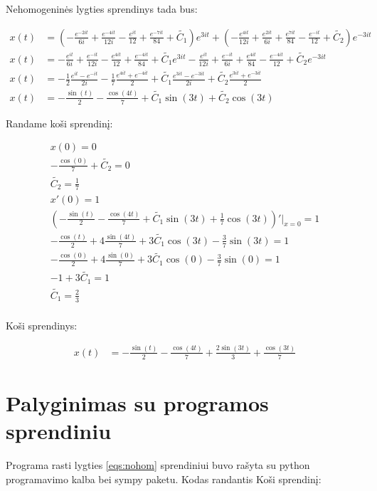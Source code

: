 \documentclass[11pt]{article}
\begin{document}
Nehomogeninės lygties sprendinys tada bus:

\begin{align*}
x(t)&=\left(-\frac{e^{-2it}}{6i}+\frac{e^{-4it}}{12i}-\frac{e^{it}}{12}+\frac{e^{-7it}}{84}+\tilde{C_1}\right)e^{3it}
+\left(-\frac{e^{4it}}{12i}+\frac{e^{2it}}{6i}+\frac{e^{7it}}{84}-\frac{e^{-it}}{12}+\tilde{C_2}\right)e^{-3it}\\
x(t)&=-\frac{e^{it}}{6i}+ \frac{e^{-it}}{12i}-\frac{e^{4it}}{12}+\frac{e^{-4it}}{84}+\tilde{C_1}e^{3it}
-\frac{e^{it}}{12i}+\frac{e^{-it}}{6i}+\frac{e^{4it}}{84}-\frac{e^{-4it}}{12}+\tilde{C_2}e^{-3it}\\
x(t)&=-\frac{1}{2}\frac{e^{it}-e^{-it}}{2i}-\frac{1}{7}\frac{e^{4it}+e^{-4it}}{2}+\tilde{C_1}\frac{e^{3it}-e^{-3it}}{2i}+\tilde{C_2}\frac{e^{3it}+e^{-3it}}{2}\\
x(t)&=-\frac{\sin(t)}{2}-\frac{\cos(4t)}{7}+\tilde{C_1}\sin(3t)+\tilde{C_2}\cos(3t)
\end{align*}

Randame koši sprendinį:

\begin{align*}
x(0)=0\\
-\frac{\cos(0)}{7}+\tilde{C_2}=0\\
\tilde{C_2}=\frac{1}{7}\\
x'(0)=1\\
\left(-\frac{\sin(t)}{2}-\frac{\cos(4t)}{7}+\tilde{C_1}\sin(3t)+\frac{1}{7}\cos(3t)\right)'\Big\vert_{x=0}=1\\
-\frac{\cos(t)}{2}+4\frac{\sin(4t)}{7}+3\tilde{C_1}\cos(3t)-\frac{3}{7}\sin(3t)=1\\
-\frac{\cos(0)}{2}+4\frac{\sin(0)}{7}+3\tilde{C_1}\cos(0)-\frac{3}{7}\sin(0)=1\\
-1+3\tilde{C_1}=1\\
\tilde{C_1}=\frac{2}{3}\\
\end{align*}

Koši sprendinys:

\begin{align}
x(t)&=-\frac{\sin(t)}{2}-\frac{\cos(4t)}{7}+\frac{2\sin(3t)}{3}+\frac{\cos(3t)}{7}
\end{align}

\section{Palyginimas su programos sprendiniu}

Programa rasti lygties \eqref{eqs:nohom} sprendiniui buvo rašyta su python programavimo
kalba bei sympy paketu. Kodas randantis Koši sprendinį:
\end{document}
